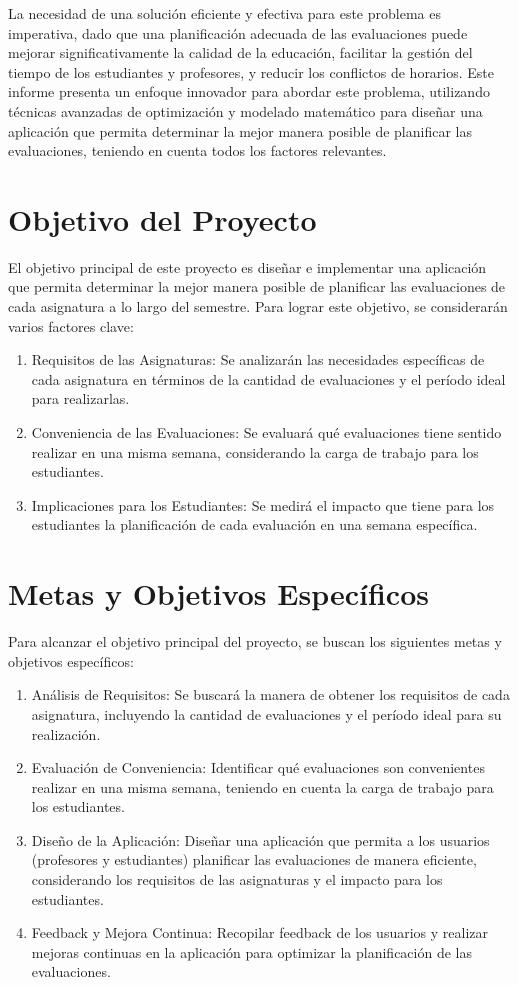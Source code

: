 \documentclass{article}
\begin{document}
La necesidad de una solución eficiente y efectiva para este problema es imperativa, dado que una planificación adecuada de las evaluaciones puede mejorar significativamente la calidad de la educación, facilitar la gestión del tiempo de los estudiantes y profesores, y reducir los conflictos de horarios. Este informe presenta un enfoque innovador para abordar este problema, utilizando técnicas avanzadas de optimización y modelado matemático para diseñar una aplicación que permita determinar la mejor manera posible de planificar las evaluaciones, teniendo en cuenta todos los factores relevantes.
\section{Objetivo del Proyecto}

El objetivo principal de este proyecto es diseñar e implementar una aplicación que permita determinar la mejor manera posible de planificar las evaluaciones de cada asignatura a lo largo del semestre. Para lograr este objetivo, se considerarán varios factores clave:

\begin{enumerate}
\item Requisitos de las Asignaturas: Se analizarán las necesidades específicas de cada asignatura en términos de la cantidad de evaluaciones y el período ideal para realizarlas.
\item Conveniencia de las Evaluaciones: Se evaluará qué evaluaciones tiene sentido realizar en una misma semana, considerando la carga de trabajo para los estudiantes.
\item Implicaciones para los Estudiantes: Se medirá el impacto que tiene para los estudiantes la planificación de cada evaluación en una semana específica.
\end{enumerate}

\section{Metas y Objetivos Específicos}

Para alcanzar el objetivo principal del proyecto, se buscan los siguientes metas y objetivos específicos:

\begin{enumerate}
\item Análisis de Requisitos: Se buscará la manera de obtener los requisitos de cada asignatura, incluyendo la cantidad de evaluaciones y el período ideal para su realización.
\item Evaluación de Conveniencia: Identificar qué evaluaciones son convenientes realizar en una misma semana, teniendo en cuenta la carga de trabajo para los estudiantes.
\item Diseño de la Aplicación: Diseñar una aplicación que permita a los usuarios (profesores y estudiantes) planificar las evaluaciones de manera eficiente, considerando los requisitos de las asignaturas y el impacto para los estudiantes.
\item Feedback y Mejora Continua: Recopilar feedback de los usuarios y realizar mejoras continuas en la aplicación para optimizar la planificación de las evaluaciones.
\end{enumerate}
\end{document}
